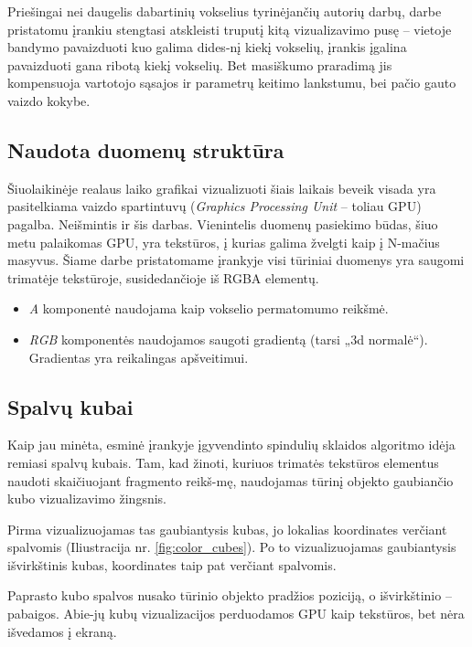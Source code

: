 Priešingai nei daugelis dabartinių vokselius tyrinėjančių autorių darbų, darbe
pristatomu įrankiu stengtasi atskleisti truputį kitą vizualizavimo pusę --
vietoje bandymo pavaizduoti kuo galima dides-nį kiekį vokselių, įrankis
įgalina pavaizduoti gana ribotą kiekį vokselių. Bet masiškumo praradimą jis
kompensuoja vartotojo sąsajos ir parametrų keitimo lankstumu, bei pačio gauto
vaizdo kokybe.

\subsection{Naudota duomenų struktūra}

Šiuolaikinėje realaus laiko grafikai vizualizuoti šiais laikais beveik visada
yra pasitelkiama vaizdo spartintuvų (\emph{Graphics Processing Unit} -- toliau
GPU) pagalba. Neišmintis ir šis darbas. Vienintelis duomenų pasiekimo būdas,
šiuo metu palaikomas GPU, yra tekstūros, į kurias galima žvelgti kaip į
N-mačius masyvus. Šiame darbe pristatomame įrankyje visi tūriniai duomenys yra
saugomi trimatėje tekstūroje, susidedančioje iš RGBA elementų.

\begin{itemize}

\item
\emph{A} komponentė naudojama kaip vokselio permatomumo reikšmė.

\item
\emph{RGB} komponentės naudojamos saugoti gradientą (tarsi „3d normalė“). Gradientas
yra reikalingas apšveitimui.

\end{itemize}

\subsection{Spalvų kubai}

Kaip jau minėta, esminė įrankyje įgyvendinto spindulių sklaidos algoritmo
idėja remiasi spalvų kubais. Tam, kad žinoti, kuriuos trimatės tekstūros
elementus naudoti skaičiuojant fragmento reikš-mę, naudojamas tūrinį objekto
gaubiančio kubo vizualizavimo žingsnis.

Pirma vizualizuojamas tas gaubiantysis kubas, jo lokalias koordinates verčiant
spalvomis (Iliustracija nr. \ref{fig:color_cubes}). Po to vizualizuojamas
gaubiantysis išvirkštinis kubas, koordinates taip pat verčiant spalvomis.

Paprasto kubo spalvos nusako tūrinio objekto pradžios poziciją, o išvirkštinio
-- pabaigos. Abie-jų kubų vizualizacijos perduodamos GPU kaip tekstūros, bet
nėra išvedamos į ekraną.

